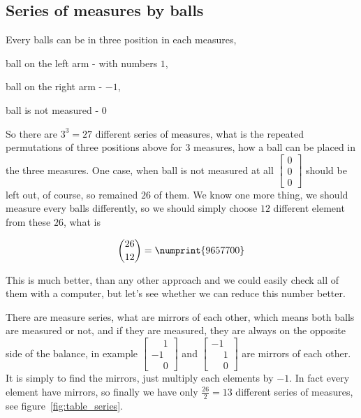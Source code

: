 \documentclass[11pt]{article} %
\begin{document}
\subsection{Series of measures by balls}

Every balls can be in three position in each measures,
\begin{asparaitem}
\item ball on the left arm - with numbers $1$,
\item ball on the right arm - $-1$,
\item ball is not measured - $0$
\end{asparaitem}
So there are $3^3 = 27$ different series of measures, what is the repeated permutations of three positions above for $3$ measures, how a ball can be placed in the three measures. One case, when ball is not measured at all $\left[\begin{smallmatrix}0\\0\\0\end{smallmatrix}\right]$ should be left out, of course, so remained $26$ of them. We know one more thing, we should measure every balls differently, so we should simply choose $12$ different element from these $26$, what is

\[ \binom{26}{12} = \numprint{9657700} \]

This is much better, than any other approach and we could easily check all of them with a computer, but let's see whether we can reduce this number better.

There are measure series, what are mirrors of each other, which means both balls are measured or not, and if they are measured, they are always on the opposite side of the balance, in example $\left[\begin{smallmatrix}\phantom{{}-{}}1\\-1\\\phantom{{}-{}}0\end{smallmatrix}\right]$ and $\left[\begin{smallmatrix}-1\\\phantom{{}-{}}1\\\phantom{{}-{}}0\end{smallmatrix}\right]$ are mirrors of each other. It is simply to find the mirrors, just multiply each elements by $-1$. In fact every element have mirrors, so finally we have only $\frac{26}{2} = 13$ different series of measures, see figure~\ref{fig:table_series}.
\end{document}
